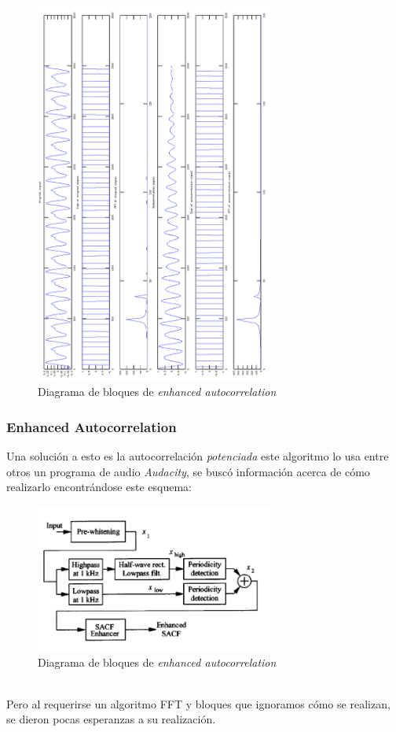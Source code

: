 	\begin{figure}[H]
	\begin{center}
		\includegraphics[width=0.7\textwidth]{./G}
	\caption{Diagrama de bloques de \emph{enhanced autocorrelation}}
	\label{default}
	\end{center}
	\end{figure}
	
	
		\subsubsection{Enhanced Autocorrelation}
		Una solución a esto es la autocorrelación \emph{potenciada} este algoritmo lo usa entre otros un programa de audio \emph{Audacity}, se buscó información acerca de cómo realizarlo encontrándose este esquema:
\begin{figure}[h]
\begin{center}
	\includegraphics[width=0.7\textwidth]{./enhanced_autocorrelation}
\caption{Diagrama de bloques de \emph{enhanced autocorrelation}}
\label{default}
\end{center}
\end{figure}\\
Pero al requerirse un algoritmo FFT y bloques que ignoramos cómo se realizan, se dieron pocas esperanzas a su realización.
		

